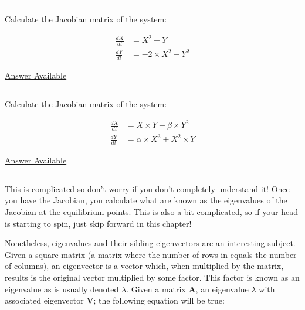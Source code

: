 \documentclass[]{memoir}
\begin{document}
\begin{center}\rule{3in}{0.4pt}\end{center}


Calculate the Jacobian matrix of the system:

\[
\begin{aligned}
\frac{dX}{dt} &= X^2 - Y \\
\frac{dY}{dt} &= -2 \times X^2 - Y^2
\end{aligned}
\]

\hyperref[Ans-11-10]{Answer Available}

\begin{center}\rule{3in}{0.4pt}\end{center}


Calculate the Jacobian matrix of the system:

\[
\begin{aligned}
\frac{dX}{dt} &= X \times Y + \beta \times Y^2 \\
\frac{dY}{dt} &= \alpha \times X^3 + X^2 \times Y
\end{aligned}
\]

\hyperref[Ans-11-11]{Answer Available}

\begin{center}\rule{3in}{0.4pt}\end{center}

This is complicated so don't worry if you don't completely understand
it! Once you have the Jacobian, you calculate what are known as the
eigenvalues of the Jacobian at the equilibrium points. This is also a
bit complicated, so if your head is starting to spin, just skip forward
in this chapter!

Nonetheless, eigenvalues and their sibling eigenvectors are an
interesting subject. Given a square matrix (a matrix where the number of
rows in equals the number of columns), an eigenvector is a vector which,
when multiplied by the matrix, results is the original vector multiplied
by some factor. This factor is known as an eigenvalue as is usually
denoted $\lambda$. Given a matrix $\mathbf{A}$, an eigenvalue $\lambda$
with associated eigenvector $\mathbf{V}$; the following equation will be
true:
\end{document}
